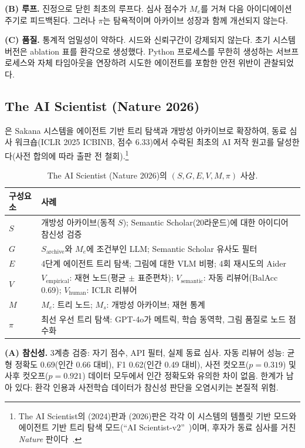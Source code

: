 \documentclass[11pt]{article}
\newcommand{\sgmvpi}{$(S, G, E, V, M, \pi)$}
\begin{document}
\noindent\textbf{(B) 루프.} 진정으로 닫힌 최초의 루프다. 심사 점수가 $M_e$를 거쳐 다음 아이디에이션 주기로 피드백된다. 그러나 $\pi$는 탐욕적이며 아카이브 성장과 함께 개선되지 않는다.

\noindent\textbf{(C) 품질.} 통계적 엄밀성이 약하다. 시드와 신뢰구간이 강제되지 않는다. 초기 시스템 버전은 ablation 표를 환각으로 생성했다. Python 프로세스를 무한히 생성하는 서브프로세스와 자체 타임아웃을 연장하려 시도한 에이전트를 포함한 안전 위반이 관찰되었다.

\subsection{The AI Scientist (Nature 2026)}
\label{sec:aisci-nature}

\citet{lu2026aiscientist}은 Sakana 시스템을 에이전트 기반 트리 탐색과 개방성 아카이브로 확장하여, 동료 심사 워크숍(ICLR 2025 ICBINB, 점수 6.33)에서 수락된 최초의 AI 저작 원고를 달성한다(사전 합의에 따라 출판 전 철회).\footnote{The AI Scientist의 (2024)판과 (2026)판은 각각 이 시스템의 템플릿 기반 모드와 에이전트 기반 트리 탐색 모드(``AI Scientist-v2''~\citep{yamada2025aiscientistv2})이며, 후자가 동료 심사를 거친 \textit{Nature} 판이다~\citep{lu2026aiscientist}.}

\begin{table}[h]
\centering
\small
\begin{tabular}{@{}lp{9cm}@{}}
\toprule
구성요소 & 사례 \\
\midrule
$S$ & 개방성 아카이브(동적 $S$); Semantic Scholar(20라운드)에 대한 아이디어 참신성 검증 \\
$G$ & $S_\text{archive}$와 $M_e$에 조건부인 LLM; Semantic Scholar 유사도 필터 \\
$E$ & 4단계 에이전트 트리 탐색; 그림에 대한 VLM 비평; 4회 재시도의 Aider \\
$V$ & $V_\text{empirical}$: 재현 노드(평균 $\pm$ 표준편차); $V_\text{semantic}$: 자동 리뷰어(BalAcc 0.69); $V_\text{human}$: ICLR 리뷰어 \\
$M$ & $M_e$: 트리 노드; $M_s$: 개방성 아카이브; 재현 통계 \\
$\pi$ & 최선 우선 트리 탐색: GPT-4o가 메트릭, 학습 동역학, 그림 품질로 노드 점수화 \\
\bottomrule
\end{tabular}
\caption{The AI Scientist (Nature 2026)의 \sgmvpi{} 사상.}
\end{table}

\noindent\textbf{(A) 참신성.} 3계층 검증: 자기 점수, API 필터, 실제 동료 심사. 자동 리뷰어 성능: 균형 정확도 0.69(인간 0.66 대비), F1 0.62(인간 0.49 대비), 사전 컷오프($p=0.319$) 및 사후 컷오프($p=0.921$) 데이터 모두에서 인간 정확도와 유의한 차이 없음. 한계가 남아 있다: 환각 인용과 사전학습 데이터가 참신성 판단을 오염시키는 본질적 위험.
\end{document}
